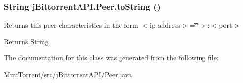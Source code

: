 \hypertarget{classj_bittorrent_a_p_i_1_1_peer_a29261679f8b9d63f464a2a9c916a6982}{
\subsubsection[{toString}]{\setlength{\rightskip}{0pt plus 5cm}String jBittorrentAPI.Peer.toString ()}}
\label{classj_bittorrent_a_p_i_1_1_peer_a29261679f8b9d63f464a2a9c916a6982}
Returns this peer characteristics in the form $<$ip address$>$=\char`\"{}\char`\"{}$>$:$<$port$>$ \begin{DoxyReturn}{Returns}
String 
\end{DoxyReturn}


The documentation for this class was generated from the following file:\begin{DoxyCompactItemize}
\item 
MiniTorrent/src/jBittorrentAPI/Peer.java\end{DoxyCompactItemize}

